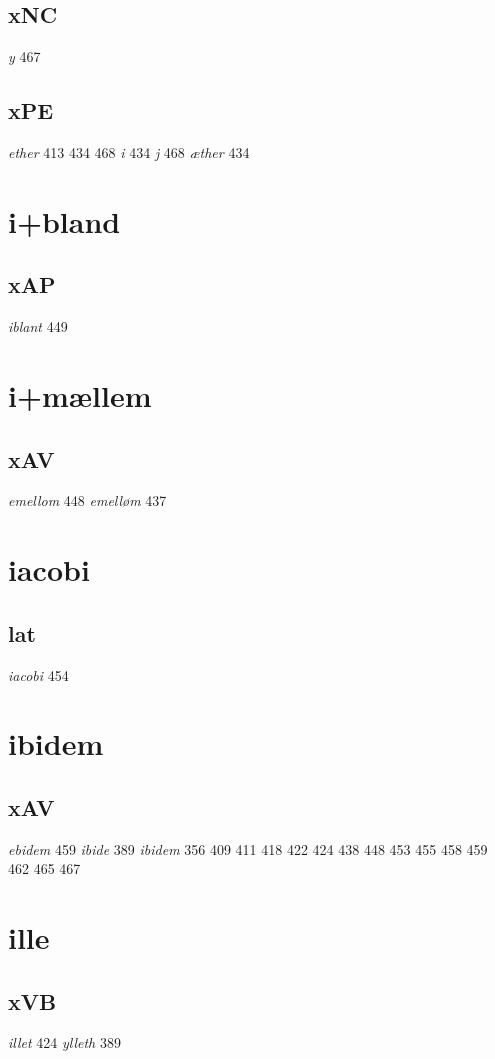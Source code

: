 \documentclass[a4paper,twocolumn]{article}
\begin{document}
\subsection{xNC}
\label{sec:org128ec61}
\emph{y} 467 
\subsection{xPE}
\label{sec:orgf885f0c}
\emph{ether} 413 434 468 \emph{i} 434 \emph{j} 468 \emph{æther} 434 
\section{i+bland}
\label{sec:org5d79955}
\subsection{xAP}
\label{sec:orgbbdd96d}
\emph{iblant} 449 
\section{i+mællem}
\label{sec:org4df9666}
\subsection{xAV}
\label{sec:orga3e173e}
\emph{emellom} 448 \emph{emelløm} 437 
\section{iacobi}
\label{sec:orgfb6d304}
\subsection{lat}
\label{sec:orge5423c9}
\emph{iacobi} 454 
\section{ibidem}
\label{sec:org931eaed}
\subsection{xAV}
\label{sec:org0ba518b}
\emph{ebidem} 459 \emph{ibide} 389 \emph{ibidem} 356 409 411 418 422 424 438 448 453 455 458 459 462 465 467 
\section{ille}
\label{sec:orgc978911}
\subsection{xVB}
\label{sec:orgb2e066e}
\emph{illet} 424 \emph{ylleth} 389 
\end{document}
